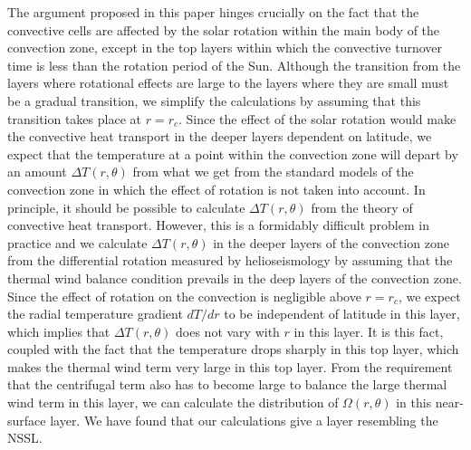 The argument proposed in this paper hinges crucially on the fact that the convective cells are affected by the solar rotation within the main body of the convection zone, except in the top layers within which the convective turnover time is less than the rotation period of the Sun.  Although the transition from the layers where rotational effects are large to the layers where they are small must be a gradual transition, we simplify the calculations by assuming that this transition takes place at $r = r_c$. Since the effect of the solar rotation would make the convective heat transport in the deeper layers dependent on latitude, we expect that the temperature at a point within the convection zone will depart by an amount $\Delta T (r, \theta)$ from what we get from the standard models of the convection zone in which the effect of rotation is not taken into account.  In principle, it should be possible to calculate $\Delta T (r, \theta)$ from the theory of convective heat transport.  However, this is a formidably difficult problem in practice and we calculate $\Delta T (r, \theta)$ in the deeper layers of the convection zone from the differential rotation measured by helioseismology by assuming that the thermal wind balance condition prevails in the deep layers of the convection zone. Since the effect of rotation on the convection is negligible above $r = r_c$, we expect the radial temperature gradient $dT/dr$ to be independent of latitude in this layer, which implies that $\Delta T (r, \theta)$ does not vary with $r$ in this layer.  It is this fact, coupled with the fact that the temperature drops sharply in this top layer, which makes the thermal wind term very large in this top layer.  From the requirement that the centrifugal term also has to become large to balance the large thermal wind term in this layer, we can calculate the distribution of $\Omega (r, \theta)$ in this near-surface layer.  We have found that our calculations give a layer resembling the NSSL.

